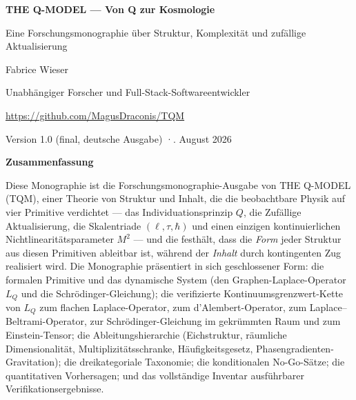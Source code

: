 \documentclass[10pt,twoside,openany]{book}
\begin{document}

\frontmatter

\begin{center}
{\LARGE\bfseries THE Q-MODEL — Von Q zur Kosmologie\par}
\vspace{0.4em}
{\large Eine Forschungsmonographie über Struktur, Komplexität und zufällige Aktualisierung\par}
\vspace{1.0em}
{\normalsize Fabrice Wieser\par}
{\small Unabhängiger Forscher und Full-Stack-Softwareentwickler\par}
{\small \url{https://github.com/MagusDraconis/TQM}\par}
\vspace{0.5em}
{\normalsize Version 1.0 (final, deutsche Ausgabe) \quad·. August 2026\par}
\end{center}

\vspace{0.8em}

{\centering\Large\bfseries Zusammenfassung\par}
\vspace{0.3em}
\noindent
Diese Monographie ist die Forschungsmonographie-Ausgabe von THE Q-MODEL (TQM), einer
Theorie von Struktur und Inhalt, die die beobachtbare Physik auf vier Primitive verdichtet
--- das Individuationsprinzip $Q$, die Zufällige Aktualisierung, die Skalentriade
$(\ell,\tau,\hbar)$ und einen einzigen kontinuierlichen Nichtlinearitätsparameter $M^2$ ---
und die festhält, dass die \emph{Form} jeder Struktur aus diesen Primitiven ableitbar ist,
während der \emph{Inhalt} durch kontingenten Zug realisiert wird. Die Monographie
präsentiert in sich geschlossener Form: die formalen Primitive und das dynamische System
(den Graphen-Laplace-Operator $L_Q$ und die Schr\"odinger-Gleichung); die verifizierte
Kontinuumsgrenzwert-Kette von $L_Q$ zum flachen Laplace-Operator, zum d'Alembert-Operator,
zum Laplace--Beltrami-Operator, zur Schr\"odinger-Gleichung im gekrümmten Raum und zum
Einstein-Tensor; die Ableitungshierarchie (Eichstruktur, räumliche Dimensionalität,
Multiplizitätsschranke, Häufigkeitsgesetz, Phasengradienten-Gravitation); die
dreikategoriale Taxonomie; die konditionalen No-Go-Sätze; die quantitativen Vorhersagen;
und das vollständige Inventar ausführbarer Verifikationsergebnisse.
\end{document}
